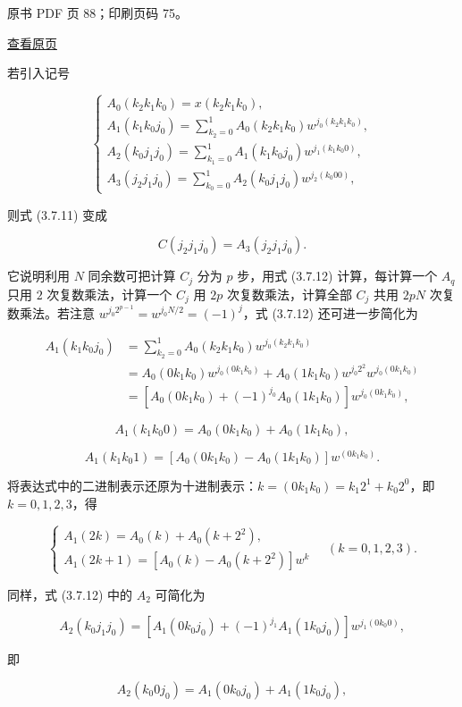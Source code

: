 \clearpage

原书 PDF 页 88；印刷页码 75。

\href{source-images/pdf-088.jpeg}{查看原页}

若引入记号

\[
\begin{cases}
A_0(k_2k_1k_0)=x(k_2k_1k_0),\\[4pt]
A_1(k_1k_0j_0)=\displaystyle\sum_{k_2=0}^1A_0(k_2k_1k_0)w^{j_0(k_2k_1k_0)},\\[4pt]
A_2(k_0j_1j_0)=\displaystyle\sum_{k_1=0}^1A_1(k_1k_0j_0)w^{j_1(k_1k_0 0)},\\[4pt]
A_3(j_2j_1j_0)=\displaystyle\sum_{k_0=0}^1A_2(k_0j_1j_0)w^{j_2(k_0 00)},
\end{cases}\tag{3.7.12}
\]

则式 (3.7.11) 变成

\[
C(j_2j_1j_0)=A_3(j_2j_1j_0).
\]

它说明利用 \(N\) 同余数可把计算 \(C_j\) 分为 \(p\) 步，用式 (3.7.12) 计算，每计算一个 \(A_q\) 只用 \(2\) 次复数乘法，计算一个 \(C_j\) 用 \(2p\) 次复数乘法，计算全部 \(C_j\) 共用 \(2pN\) 次复数乘法。若注意 \(w^{j_0 2^{p-1}}=w^{j_0N/2}=(-1)^j\)，式 (3.7.12) 还可进一步简化为

\[
\begin{aligned}
A_1(k_1k_0j_0)&=\sum_{k_2=0}^1A_0(k_2k_1k_0)w^{j_0(k_2k_1k_0)}\\
&=A_0(0k_1k_0)w^{j_0(0k_1k_0)}+A_0(1k_1k_0)w^{j_0 2^2}w^{j_0(0k_1k_0)}\\
&=[A_0(0k_1k_0)+(-1)^{j_0}A_0(1k_1k_0)]w^{j_0(0k_1k_0)},
\end{aligned}
\]

\[
A_1(k_1k_0 0)=A_0(0k_1k_0)+A_0(1k_1k_0),
\]

\[
A_1(k_1k_0 1)=[A_0(0k_1k_0)-A_0(1k_1k_0)]w^{(0k_1k_0)}.
\]

将表达式中的二进制表示还原为十进制表示：\(k=(0k_1k_0)=k_1 2^1+k_0 2^0\)，即 \(k=0,1,2,3\)，得

\[
\begin{cases}
A_1(2k)=A_0(k)+A_0(k+2^2),\\
A_1(2k+1)=[A_0(k)-A_0(k+2^2)]w^k
\end{cases}\quad(k=0,1,2,3).\tag{3.7.13}
\]

同样，式 (3.7.12) 中的 \(A_2\) 可简化为

\[
A_2(k_0j_1j_0)=[A_1(0k_0j_0)+(-1)^{j_1}A_1(1k_0j_0)]w^{j_1(0k_0 0)},
\]

即

\[
A_2(k_0 0j_0)=A_1(0k_0j_0)+A_1(1k_0j_0),
\]

